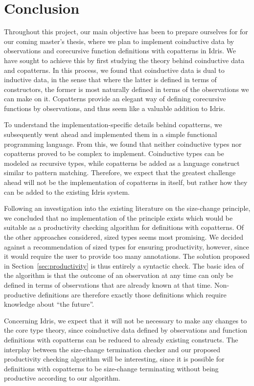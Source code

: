 \section{Conclusion}
\label{sec:conclusion}
Throughout this project, our main objective has been to prepare ourselves for for our coming master's thesis, where we plan to implement coinductive data by observations and corecursive function definitions with copatterns in Idris. We have sought to achieve this by first studying the theory behind coinductive data and copatterns. In this process, we found that coinductive data is dual to inductive data, in the sense that where the latter is defined in terms of constructors, the former is most naturally defined in terms of the observations we can make on it. Copatterns provide an elegant way of defining corecursive functions by observations, and thus seem like a valuable addition to Idris. 

To understand the implementation-specific details behind copatterns, we subsequently went ahead and implemented them in a simple functional programming language. From this, we found that neither coinductive types nor copatterns proved to be complex to implement. Coinductive types can be modeled as recursive types, while copatterns be added as a language construct similar to pattern matching. Therefore, we expect that the greatest challenge ahead will not be the implementation of copatterns in itself, but rather how they can be added to the existing Idris system.

Following an investigation into the existing literature on the size-change principle, we concluded that no implementation of the principle exists which would be suitable as a productivity checking algorithm for definitions with copatterns. Of the other approaches considered, sized types seems most promising. We decided against a recommendation of sized types for ensuring productivity, however, since it would require the user to provide too many annotations. The solution proposed in Section~\ref{sec:productivity} is thus entirely a syntactic check. The basic idea of the algorithm is that the outcome of an observation at any time can only be defined in terms of observations that are already known at that time. Non-productive definitions are therefore exactly those definitions which require knowledge about ``the future''.

Concerning Idris, we expect that it will not be necessary to make any changes to the core type theory, since coinductive data defined by observations and function definitions with copatterns can be reduced to already existing constructs. The interplay between the size-change termination checker and our proposed productivity checking algorithm will be interesting, since it is possible for definitions with copatterns to be size-change terminating without being productive according to our algorithm.

